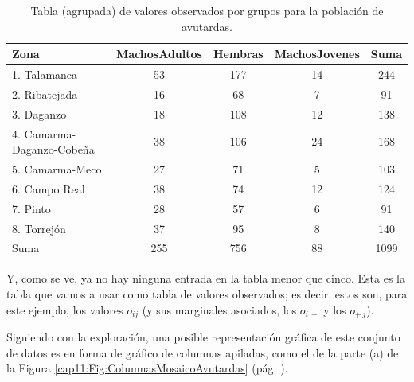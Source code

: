 \begin{Ejemplo}
\begin{table}[ht]
\centering
\begin{tabular}{lcccc}
      \hline
     Zona & MachosAdultos & Hembras & MachosJovenes & Suma \\
      \hline
        1. Talamanca & 53 & 177 & 14 & 244 \\
        2. Ribatejada & 16 & 68 & 7 & 91 \\
        3. Daganzo & 18 & 108 & 12 & 138 \\
        4. Camarma-Daganzo-Cobeña & 38 & 106 & 24 & 168 \\
        5. Camarma-Meco & 27 & 71 & 5 & 103 \\
        6. Campo Real & 38 & 74 & 12 & 124 \\
        7. Pinto & 28 & 57 & 6 & 91 \\
        8. Torrejón & 37 & 95 & 8 & 140 \\
       \hline
      Suma & 255 & 756 & 88 & 1099 \\
       \hline
\end{tabular}
\caption{Tabla ({\sf agrupada}) de valores observados por grupos para la población de avutardas.}\label{cap13:Tabla:AvutardasValoresObservados2}
\end{table}
Y, como se ve, ya no hay ninguna entrada en la tabla menor que cinco. Esta es la tabla que vamos a
usar como tabla de valores observados; es decir, estos son, para este ejemplo, los valores $o_{ij}$
(y sus marginales asociados, los $o_{i\,+}$ y los $o_{+\,j}$).

Siguiendo con la exploración, una posible representación gráfica de este conjunto de datos es en
forma de gráfico de columnas apiladas, como el de la parte (a) de la Figura \ref{cap11:Fig:ColumnasMosaicoAvutardas} (pág. \pageref{cap11:Fig:ColumnasMosaicoAvutardas}).


\end{Ejemplo}
